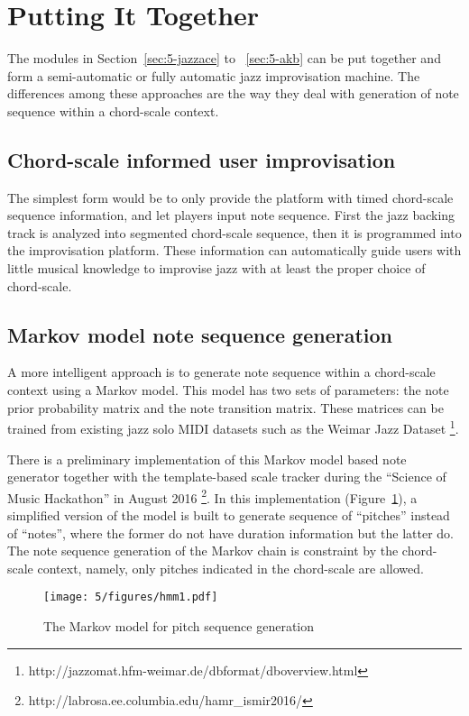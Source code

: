 \section{Putting It Together}\label{sec:5-puttogether}
The modules in Section~\ref{sec:5-jazzace} to ~\ref{sec:5-akb} can be put together and form a semi-automatic or fully automatic jazz improvisation machine. The differences among these approaches are the way they deal with generation of note sequence within a chord-scale context.

\subsection{Chord-scale informed user improvisation}
The simplest form would be to only provide the platform with timed chord-scale sequence information, and let players input note sequence. First the jazz backing track is analyzed into segmented chord-scale sequence, then it is programmed into the improvisation platform. These information can automatically guide users with little musical knowledge to improvise jazz with at least the proper choice of chord-scale.

\subsection{Markov model note sequence generation}
A more intelligent approach is to generate note sequence within a chord-scale context using a Markov model. This model has two sets of parameters: the note prior probability matrix and the note transition matrix. These matrices can be trained from existing jazz solo MIDI datasets such as the Weimar Jazz Dataset \footnote{http://jazzomat.hfm-weimar.de/dbformat/dboverview.html}\cite{abesser2013introducing}.

There is a preliminary implementation of this Markov model based note generator together with the template-based scale tracker during the ``Science of Music Hackathon'' in August 2016 \footnote{http://labrosa.ee.columbia.edu/hamr\_ismir2016/}. In this implementation (Figure~\ref{fig:5-hmm1}), a simplified version of the model is built to generate sequence of ``pitches'' instead of ``notes'', where the former do not have duration information but the latter do. The note sequence generation of the Markov chain is constraint by the chord-scale context, namely, only pitches indicated in the chord-scale are allowed.

\begin{figure}[htb]
    \centering
        \texttt{[image: 5/figures/hmm1.pdf]}
    \caption{The Markov model for pitch sequence generation}
    \label{fig:5-hmm1}
\end{figure}

